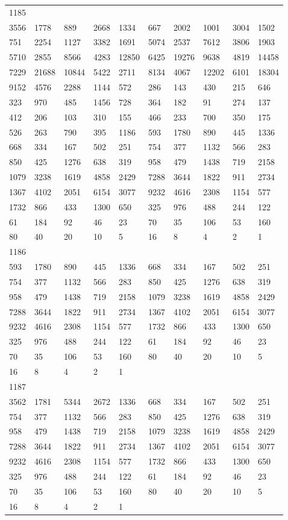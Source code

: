 \begin{longtable}{*{10}{l}}
1185&&&&&&&&&\\
3556& 1778& 889& 2668& 1334& 667& 2002& 1001& 3004& 1502\\
751& 2254& 1127& 3382& 1691& 5074& 2537& 7612& 3806& 1903\\
5710& 2855& 8566& 4283& 12850& 6425& 19276& 9638& 4819& 14458\\
7229& 21688& 10844& 5422& 2711& 8134& 4067& 12202& 6101& 18304\\
9152& 4576& 2288& 1144& 572& 286& 143& 430& 215& 646\\
323& 970& 485& 1456& 728& 364& 182& 91& 274& 137\\
412& 206& 103& 310& 155& 466& 233& 700& 350& 175\\
526& 263& 790& 395& 1186& 593& 1780& 890& 445& 1336\\
668& 334& 167& 502& 251& 754& 377& 1132& 566& 283\\
850& 425& 1276& 638& 319& 958& 479& 1438& 719& 2158\\
1079& 3238& 1619& 4858& 2429& 7288& 3644& 1822& 911& 2734\\
1367& 4102& 2051& 6154& 3077& 9232& 4616& 2308& 1154& 577\\
1732& 866& 433& 1300& 650& 325& 976& 488& 244& 122\\
61& 184& 92& 46& 23& 70& 35& 106& 53& 160\\
80& 40& 20& 10& 5& 16& 8& 4& 2& 1\\

1186&&&&&&&&&\\
593& 1780& 890& 445& 1336& 668& 334& 167& 502& 251\\
754& 377& 1132& 566& 283& 850& 425& 1276& 638& 319\\
958& 479& 1438& 719& 2158& 1079& 3238& 1619& 4858& 2429\\
7288& 3644& 1822& 911& 2734& 1367& 4102& 2051& 6154& 3077\\
9232& 4616& 2308& 1154& 577& 1732& 866& 433& 1300& 650\\
325& 976& 488& 244& 122& 61& 184& 92& 46& 23\\
70& 35& 106& 53& 160& 80& 40& 20& 10& 5\\
16& 8& 4& 2& 1& \\

1187&&&&&&&&&\\
3562& 1781& 5344& 2672& 1336& 668& 334& 167& 502& 251\\
754& 377& 1132& 566& 283& 850& 425& 1276& 638& 319\\
958& 479& 1438& 719& 2158& 1079& 3238& 1619& 4858& 2429\\
7288& 3644& 1822& 911& 2734& 1367& 4102& 2051& 6154& 3077\\
9232& 4616& 2308& 1154& 577& 1732& 866& 433& 1300& 650\\
325& 976& 488& 244& 122& 61& 184& 92& 46& 23\\
70& 35& 106& 53& 160& 80& 40& 20& 10& 5\\
16& 8& 4& 2& 1& \\


\end{longtable}
